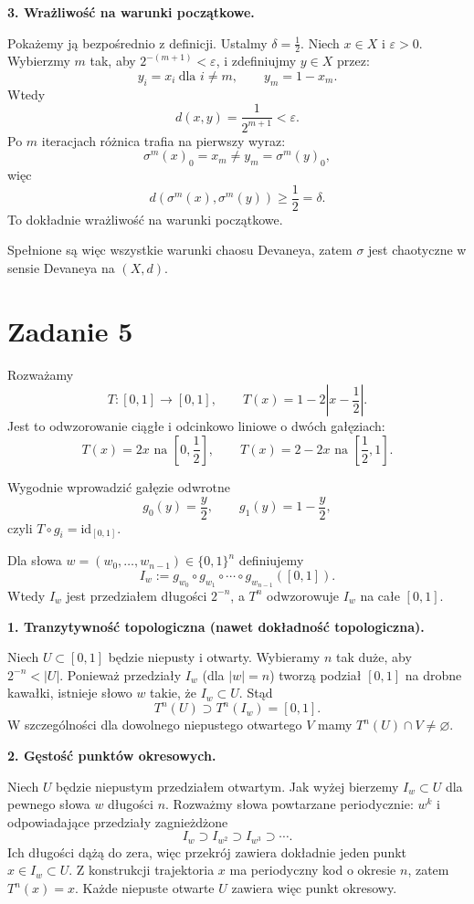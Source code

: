 \documentclass[11pt,a4paper]{article}
\theoremstyle{plain}
\theoremstyle{definition}
\begin{document}
\textbf{3. Wrażliwość na warunki początkowe.}

Pokażemy ją bezpośrednio z definicji. Ustalmy $\delta=\tfrac12$. Niech $x\in X$ i $\varepsilon>0$. Wybierzmy $m$ tak, aby $2^{-(m+1)}<\varepsilon$, i zdefiniujmy $y\in X$ przez:
\[
y_i=x_i\ \text{dla } i\neq m,
\qquad
y_m=1-x_m.
\]
Wtedy
\[
d(x,y)=\frac{1}{2^{m+1}}<\varepsilon.
\]
Po $m$ iteracjach różnica trafia na pierwszy wyraz:
\[
\sigma^m(x)_0=x_m\neq y_m=\sigma^m(y)_0,
\]
więc
\[
d(\sigma^m(x),\sigma^m(y))\ge \frac12=\delta.
\]
To dokładnie wrażliwość na warunki początkowe.

Spełnione są więc wszystkie warunki chaosu Devaneya, zatem $\sigma$ jest chaotyczne w sensie Devaneya na $(X,d)$.

\section{Zadanie 5}

Rozważamy
\[
T:[0,1]\to[0,1],
\qquad
T(x)=1-2\left|x-\frac12\right|.
\]
Jest to odwzorowanie ciągłe i odcinkowo liniowe o dwóch gałęziach:
\[
T(x)=2x \text{ na } \left[0,\frac12\right],
\qquad
T(x)=2-2x \text{ na } \left[\frac12,1\right].
\]

Wygodnie wprowadzić gałęzie odwrotne
\[
g_0(y)=\frac y2,\qquad g_1(y)=1-\frac y2,
\]
czyli $T\circ g_i=\mathrm{id}_{[0,1]}$.

Dla słowa $w=(w_0,\dots,w_{n-1})\in\{0,1\}^n$ definiujemy
\[
I_w := g_{w_0}\circ g_{w_1}\circ\cdots\circ g_{w_{n-1}}([0,1]).
\]
Wtedy $I_w$ jest przedziałem długości $2^{-n}$, a $T^n$ odwzorowuje $I_w$ na całe $[0,1]$.

\textbf{1. Tranzytywność topologiczna (nawet dokładność topologiczna).}

Niech $U\subset[0,1]$ będzie niepusty i otwarty. Wybieramy $n$ tak duże, aby $2^{-n}<|U|$. Ponieważ przedziały $I_w$ (dla $|w|=n$) tworzą podział $[0,1]$ na drobne kawałki, istnieje słowo $w$ takie, że $I_w\subset U$.
Stąd
\[
T^n(U)\supset T^n(I_w)=[0,1].
\]
W szczególności dla dowolnego niepustego otwartego $V$ mamy $T^n(U)\cap V\neq\varnothing$.

\textbf{2. Gęstość punktów okresowych.}

Niech $U$ będzie niepustym przedziałem otwartym. Jak wyżej bierzemy $I_w\subset U$ dla pewnego słowa $w$ długości $n$.
Rozważmy słowa powtarzane periodycznie: $w^k$ i odpowiadające przedziały zagnieżdżone
\[
I_w\supset I_{w^2}\supset I_{w^3}\supset\cdots.
\]
Ich długości dążą do zera, więc przekrój zawiera dokładnie jeden punkt $x\in I_w\subset U$.
Z konstrukcji trajektoria $x$ ma periodyczny kod o okresie $n$, zatem $T^n(x)=x$.
Każde niepuste otwarte $U$ zawiera więc punkt okresowy.
\end{document}
